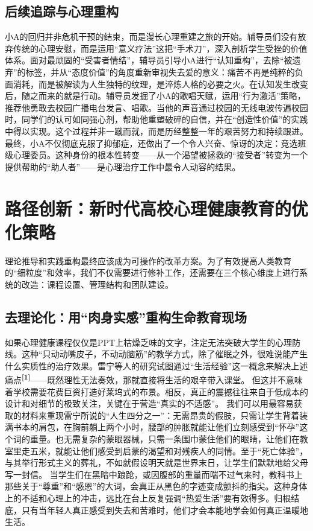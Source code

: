 \documentclass[a4paper,12pt]{ctexart}
\newcommand{\upcite}[1]{\textbf{\textsuperscript{[#1]}}}
\begin{document}
\subsection{后续追踪与心理重构}
小A的回归并非危机干预的结束，而是漫长心理重建之旅的开始。辅导员们没有放弃传统的心理安慰，而是运用“意义疗法”这把“手术刀”，深入剖析学生受挫的价值体系。面对最顽固的“受害者情结”，辅导员引导小A进行“认知重构”，去除“被遗弃”的标签，并从“态度价值”的角度重新审视失去爱的意义：痛苦不再是纯粹的负面消耗，而是被解读为人生独特的纹理，是淬炼人格的必要之火。在认知发生改变后，随之而来的就是行动。辅导员发掘了小A的歌唱天赋，运用“行为激活”策略，推荐他勇敢去校园广播电台发言、唱歌。当他的声音通过校园的无线电波传遍校园时，同学们的认可如同强心剂，帮助他重塑破碎的自信，并在“创造性价值”的实践中得以实现。这个过程并非一蹴而就，而是历经整整一年的艰苦努力和持续跟进。最终，小A不仅彻底克服了抑郁症，还做出了一个令人兴奋、惊讶的决定：竞选班级心理委员。这种身份的根本性转变——从一个渴望被拯救的“接受者”转变为一个提供帮助的“助人者”——是心理治疗工作中最令人动容的结果。

\section{路径创新：新时代高校心理健康教育的优化策略}
理论推导和实践重构最终应该成为可操作的改革方案。为了有效提高人类教育的“细粒度”和效率，我们不仅需要进行修补工作，还需要在三个核心维度上进行系统的改造：课程设置、管理结构和团队建设。

\subsection{去理论化：用“肉身实感”重构生命教育现场}

如果心理健康课程仅仅是PPT上枯燥乏味的文字，注定无法突破大学生的心理防线。这种“只动动嘴皮子，不动动脑筋”的教学方式，除了催眠之外，很难说能产生什么实质性的治疗效果。雷宁等人的研究试图通过“生活经验”这一概念来解决上述痛点\upcite{1}——既然理性无法奏效，那就直接将生活的艰辛带入课堂。
但这并不意味着学校需要花费巨资打造好莱坞式的布景。相反，真正的震撼往往来自于低成本的设计和对细节的极致关注，关键在于营造“真实的不适感”。
我们可以用最容易获取的材料来重现雷宁所说的“人生四分之一”：无需昂贵的假肢，只需让学生背着装满书本的肩包，在胸前躺上两个小时，腰部的肿胀就能让他们立刻感受到“怀孕”这个词的重量。也无需复杂的蒙眼器械，只需一条围巾蒙住他们的眼睛，让他们在教室里走五米，就能让他们感受到启蒙的渴望和对残疾人的同情。至于“死亡体验”，与其举行形式主义的葬礼，不如就假设明天就是世界末日，让学生们默默地给父母写一封信。
当学生们在黑暗中踉跄，或因腹部的重量而喘不过气来时，教科书上那些关于“尊重”和“感恩”的大词，会真正从黑色的字迹变成颤抖的指尖。这种身体上的不适和心理上的冲击，远比在台上反复强调“热爱生活”要有效得多。归根结底，只有当年轻人真正感受到失去和苦难时，他们才会本能地学会如何真正温暖地生活。
\end{document}
